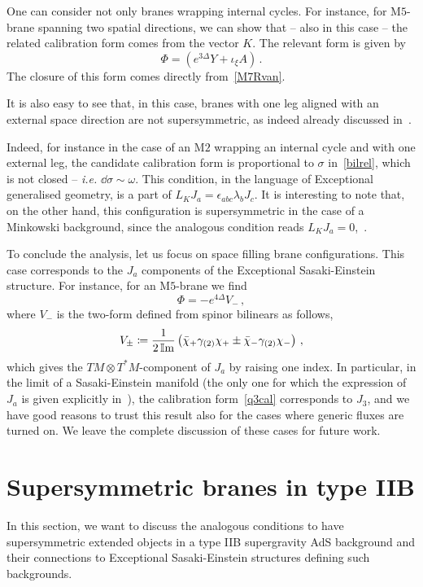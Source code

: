 \documentclass[debug]{phd}
\begin{document}
One can consider not only branes wrapping internal cycles. 
For instance, for $\mathrm{M}5$-brane spanning two spatial directions, we can show that -- also in this case -- the related calibration form comes from the vector $K$. 
The relevant form is given by
		\begin{equation}
			\Phi = (e^{3\Delta} Y + \iota_{\xi} A) \, .
		\end{equation}
The closure of this form comes directly from~\eqref{M7Rvan}.

It is also easy to see that, in this case, branes with one leg aligned with an external space direction 
are not supersymmetric, as indeed already discussed in~\cite{SanchezLoureda:2005ap}.

Indeed, for instance in the case of an $\mathrm{M}2$ wrapping an internal cycle and with one external leg, the candidate calibration form is proportional to $\sigma$ in~\eqref{bilrel}, which is not closed -- \emph{i.e.} $\dd  \sigma \sim \omega$. 
This condition, in the language of Exceptional generalised geometry, is a part of $ L_K J_a = \epsilon_{abc}  \lambda_b J_c $. 
It is interesting to note that, on the other hand, this configuration is supersymmetric in the case of a Minkowski background, since the analogous condition reads $L_K J_a = 0$,~\cite{AshmoreECY}.

To conclude the analysis, let us focus on space filling brane configurations. 
This case corresponds to the $J_a$ components of the Exceptional Sasaki-Einstein structure. 
For instance, for an $\mathrm{M}5$-brane we find
		\begin{equation}
		\label{q3cal}
			\Phi = -e^{4\Delta}{V}_-\, ,
		\end{equation}
where $V_{-}$ is the two-form defined from spinor bilinears as follows,
		\begin{equation}
		\label{Vbil}
			V_{\pm} \coloneqq \dfrac{1}{2\operatorname{\mathbb{I}m}} \left( \bar{\chi}_+ \gamma_{(2)}\chi_+ \pm \bar{\chi}_- \gamma_{(2)}\chi_-\right)\, ,
		\end{equation}
	which gives the $TM \otimes T^*M$-component of $J_a$ by raising one index. 
	In particular, in the limit of a Sasaki-Einstein manifold (the only one for which the expression of $J_a$ is given explicitly in~\cite{AshmoreESE}), the calibration form~\eqref{q3cal} corresponds to $J_3$, and we have good reasons to trust this result also for the cases where generic fluxes are turned on. 
	We leave the complete discussion of these cases for future work.

\section{Supersymmetric branes in type IIB}
\label{sec:IIBcal}
%
In this section, we want to discuss the analogous conditions to have supersymmetric extended objects in a type IIB supergravity AdS background and their connections to Exceptional Sasaki-Einstein structures defining such backgrounds.
\end{document}
